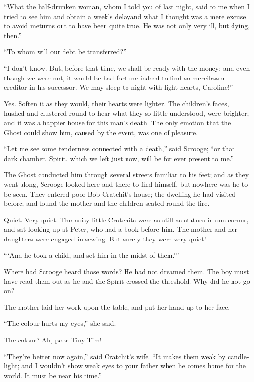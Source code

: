 \documentclass[paper=5.5in:8.5in,BCOR=5mm,twoside,DIV=calc,12pt,usegeometry]{scrbook} %
\begin{document}
\enquote{What the half-drunken woman, whom I told you of last night, said to me when I tried to see him and obtain a week's delay\textemdash and what I thought was a mere excuse to avoid me\textemdash turns out to have been quite true. He was not only very ill, but dying, then.}

\enquote{To whom will our debt be transferred?}

\enquote{I don't know. But, before that time, we shall be ready with the money; and even though we were not, it would be bad fortune indeed to find so merciless a creditor in his successor. We may sleep to-night with light hearts, Caroline!}

Yes. Soften it as they would, their hearts were lighter. The children's faces, hushed and clustered round to hear what they so little understood, were brighter; and it was a happier house for this man's death! The only emotion that the Ghost could show him, caused by the event, was one of pleasure.

\enquote{Let me see some tenderness connected with a death,} said Scrooge; \enquote{or that dark chamber, Spirit, which we left just now, will be for ever present to me.}

The Ghost conducted him through several streets familiar to his feet; and as they went along, Scrooge looked here and there to find himself, but nowhere was he to be seen. They entered poor Bob Cratchit's house; the dwelling he had visited before; and found the mother and the children seated round the fire.

Quiet. Very quiet. The noisy little Cratchits were as still as statues in one corner, and sat looking up at Peter, who had a book before him. The mother and her daughters were engaged in sewing. But surely they were very quiet!

\enquote{\enquote{And he took a child, and set him in the midst of them.}}

Where had Scrooge heard those words? He had not dreamed them. The boy must have read them out as he and the Spirit crossed the threshold. Why did he not go on?

The mother laid her work upon the table, and put her hand up to her face.

\enquote{The colour hurts my eyes,} she said.

The colour? Ah, poor Tiny Tim!

\enquote{They're better now again,} said Cratchit's wife. \enquote{It makes them weak by candle-light; and I wouldn't show weak eyes to your father when he comes home for the world. It must be near his time.}
\end{document}
